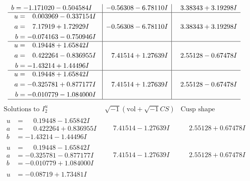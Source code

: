 \documentclass[1p]{elsarticle_modified}
\theoremstyle{definition}
\newcommand{\I}{\sqrt{-1}}
\begin{document}
$$\begin{array}{c|c|c}
\begin{aligned}
b &= -1.171020 - 0.504584 I\end{aligned}
 & -0.56308 - 6.78110 I & \phantom{-}3.38343 + 3.19298 I \\ \hline\begin{aligned}
u &= \phantom{-}0.003969 - 0.337154 I \\
a &= \phantom{-}7.17919 + 1.72929 I \\
b &= -0.074163 - 0.750946 I\end{aligned}
 & -0.56308 - 6.78110 I & \phantom{-}3.38343 + 3.19298 I \\ \hline\begin{aligned}
u &= \phantom{-}0.19448 + 1.65842 I \\
a &= \phantom{-}0.422264 - 0.836955 I \\
b &= -1.43214 + 1.44496 I\end{aligned}
 & \phantom{-}7.41514 + 1.27639 I & \phantom{-}2.55128 - 0.67478 I \\ \hline\begin{aligned}
u &= \phantom{-}0.19448 + 1.65842 I \\
a &= -0.325781 + 0.877177 I \\
b &= -0.010779 - 1.084000 I\end{aligned}
 & \phantom{-}7.41514 + 1.27639 I & \phantom{-}2.55128 - 0.67478 I\\
 \hline 
 \end{array}$$\newpage$$\begin{array}{c|c|c}  
\text{Solutions to }I^u_{2}& \I (\text{vol} + \sqrt{-1}CS) & \text{Cusp shape}\\
 \hline 
\begin{aligned}
u &= \phantom{-}0.19448 - 1.65842 I \\
a &= \phantom{-}0.422264 + 0.836955 I \\
b &= -1.43214 - 1.44496 I\end{aligned}
 & \phantom{-}7.41514 - 1.27639 I & \phantom{-}2.55128 + 0.67478 I \\ \hline\begin{aligned}
u &= \phantom{-}0.19448 - 1.65842 I \\
a &= -0.325781 - 0.877177 I \\
b &= -0.010779 + 1.084000 I\end{aligned}
 & \phantom{-}7.41514 - 1.27639 I & \phantom{-}2.55128 + 0.67478 I \\ \hline\begin{aligned}
u &= -0.08719 + 1.73481 I \\

\end{aligned}
\end{array}$$
\end{document}

